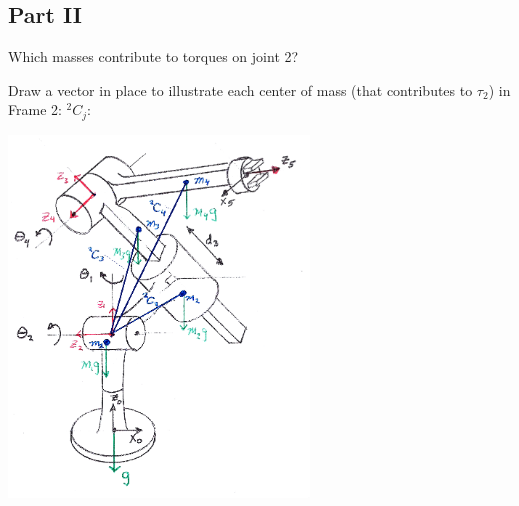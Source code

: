 \begin{ExampleCont}

\subsection*{Part II}

Which masses contribute to torques on joint 2?

Draw a vector in place to illustrate each center of mass (that contributes to $\tau_2$) in   Frame 2:  $^2C_j$:

\includegraphics[width=80mm]{figs06/00858A.eps}





\end{ExampleCont}



